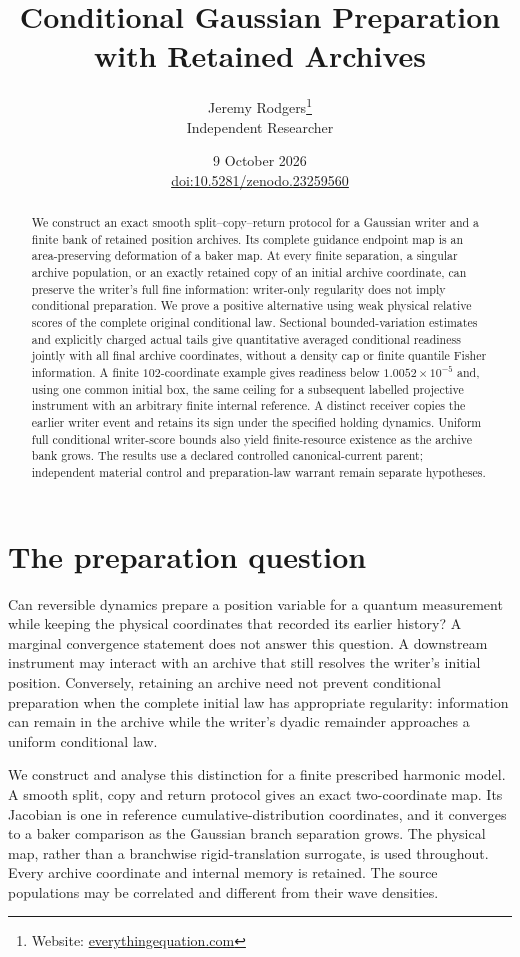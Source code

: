 \documentclass[11pt]{article}
\title{Conditional Gaussian Preparation\protect\\with Retained Archives}
\author{Jeremy Rodgers\thanks{Website: \href{https://everythingequation.com}{everythingequation.com}}\\Independent Researcher}
\date{9 October 2026\\[0.4em]
\normalsize\href{https://doi.org/10.5281/zenodo.23259560}{doi:10.5281/zenodo.23259560}}
\numberwithin{equation}{section}
\theoremstyle{definition}
\theoremstyle{remark}
\begin{document}
\maketitle
\begin{abstract}
We construct an exact smooth split--copy--return protocol for a Gaussian writer and a finite bank of retained position archives. Its complete guidance endpoint map is an area-preserving deformation of a baker map. At every finite separation, a singular archive population, or an exactly retained copy of an initial archive coordinate, can preserve the writer's full fine information: writer-only regularity does not imply conditional preparation. We prove a positive alternative using weak physical relative scores of the complete original conditional law. Sectional bounded-variation estimates and explicitly charged actual tails give quantitative averaged conditional readiness jointly with all final archive coordinates, without a density cap or finite quantile Fisher information. A finite $102$-coordinate example gives readiness below $1.0052\times10^{-5}$ and, using one common initial box, the same ceiling for a subsequent labelled projective instrument with an arbitrary finite internal reference. A distinct receiver copies the earlier writer event and retains its sign under the specified holding dynamics. Uniform full conditional writer-score bounds also yield finite-resource existence as the archive bank grows. The results use a declared controlled canonical-current parent; independent material control and preparation-law warrant remain separate hypotheses.
\end{abstract}
\clearpage
\tableofcontents
\newpage
\section{The preparation question}\label{sec:introduction}
Can reversible dynamics prepare a position variable for a quantum measurement while keeping the physical coordinates that recorded its earlier history? A marginal convergence statement does not answer this question. A downstream instrument may interact with an archive that still resolves the writer's initial position. Conversely, retaining an archive need not prevent conditional preparation when the complete initial law has appropriate regularity: information can remain in the archive while the writer's dyadic remainder approaches a uniform conditional law.

We construct and analyse this distinction for a finite prescribed harmonic model. A smooth split, copy and return protocol gives an exact two-coordinate map. Its Jacobian is one in reference cumulative-distribution coordinates, and it converges to a baker comparison as the Gaussian branch separation grows. The physical map, rather than a branchwise rigid-translation surrogate, is used throughout. Every archive coordinate and internal memory is retained. The source populations may be correlated and different from their wave densities.
\end{document}
